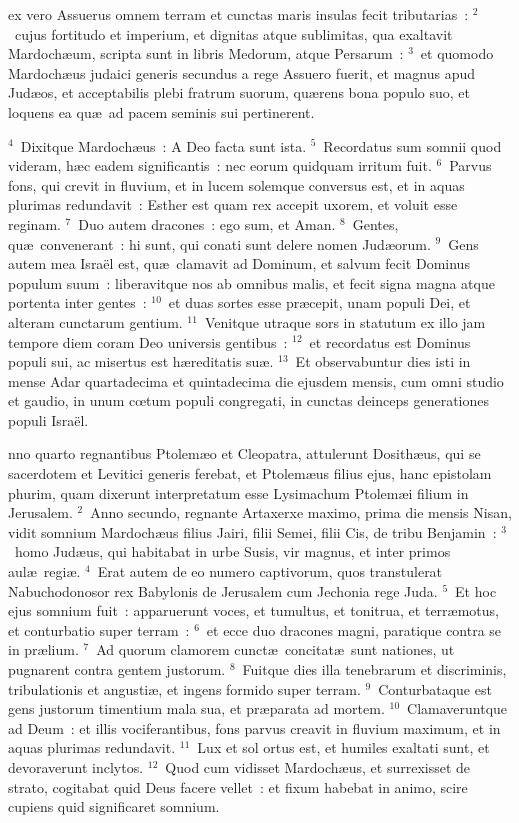 \bchapter
{}ex vero Assuerus omnem terram et cunctas maris insulas fecit tributarias~:
${}^{2}$~cujus fortitudo et imperium, et dignitas atque sublimitas, qua exaltavit Mardoch\ae um, scripta sunt in libris Medorum, atque Persarum~:
${}^{3}$~et quomodo Mardoch\ae us judaici generis secundus a rege Assuero fuerit, et magnus apud Jud\ae os, et acceptabilis plebi fratrum suorum, qu\ae rens bona populo suo, et loquens ea qu\ae\ ad pacem seminis sui pertinerent.


${}^{4}$~Dixitque Mardoch\ae us~: A Deo facta sunt ista.
${}^{5}$~Recordatus sum somnii quod videram, h\ae c eadem significantis~: nec eorum quidquam irritum fuit.
${}^{6}$~Parvus fons, qui crevit in fluvium, et in lucem solemque conversus est, et in aquas plurimas redundavit~: Esther est quam rex accepit uxorem, et voluit esse reginam.
${}^{7}$~Duo autem dracones~: ego sum, et Aman.
${}^{8}$~Gentes, qu\ae\ convenerant~: hi sunt, qui conati sunt delere nomen Jud\ae orum.
${}^{9}$~Gens autem mea Isra\"el est, qu\ae\ clamavit ad Dominum, et salvum fecit Dominus populum suum~: liberavitque nos ab omnibus malis, et fecit signa magna atque portenta inter gentes~:
${}^{10}$~et duas sortes esse pr\ae cepit, unam populi Dei, et alteram cunctarum gentium.
${}^{11}$~Venitque utraque sors in statutum ex illo jam tempore diem coram Deo universis gentibus~:
${}^{12}$~et recordatus est Dominus populi sui, ac misertus est h\ae reditatis su\ae .
${}^{13}$~Et observabuntur dies isti in mense Adar quartadecima et quintadecima die ejusdem mensis, cum omni studio et gaudio, in unum cœtum populi congregati, in cunctas deinceps generationes populi Isra\"el.

\bchapter
{}nno quarto regnantibus Ptolem\ae o et Cleopatra, attulerunt Dosith\ae us, qui se sacerdotem et Levitici generis ferebat, et Ptolem\ae us filius ejus, hanc epistolam phurim, quam dixerunt interpretatum esse Lysimachum Ptolem\ae i filium in Jerusalem.
${}^{2}$~Anno secundo, regnante Artaxerxe maximo, prima die mensis Nisan, vidit somnium Mardoch\ae us filius Jairi, filii Semei, filii Cis, de tribu Benjamin~:
${}^{3}$~homo Jud\ae us, qui habitabat in urbe Susis, vir magnus, et inter primos aul\ae\ regi\ae .
${}^{4}$~Erat autem de eo numero captivorum, quos transtulerat Nabuchodonosor rex Babylonis de Jerusalem cum Jechonia rege Juda.
${}^{5}$~Et hoc ejus somnium fuit~: apparuerunt voces, et tumultus, et tonitrua, et terr\ae motus, et conturbatio super terram~:
${}^{6}$~et ecce duo dracones magni, paratique contra se in pr\ae lium.
${}^{7}$~Ad quorum clamorem cunct\ae\ concitat\ae\ sunt nationes, ut pugnarent contra gentem justorum.
${}^{8}$~Fuitque dies illa tenebrarum et discriminis, tribulationis et angusti\ae , et ingens formido super terram.
${}^{9}$~Conturbataque est gens justorum timentium mala sua, et pr\ae parata ad mortem.
${}^{10}$~Clamaveruntque ad Deum~: et illis vociferantibus, fons parvus creavit in fluvium maximum, et in aquas plurimas redundavit.
${}^{11}$~Lux et sol ortus est, et humiles exaltati sunt, et devoraverunt inclytos.
${}^{12}$~Quod cum vidisset Mardoch\ae us, et surrexisset de strato, cogitabat quid Deus facere vellet~: et fixum habebat in animo, scire cupiens quid significaret somnium.


